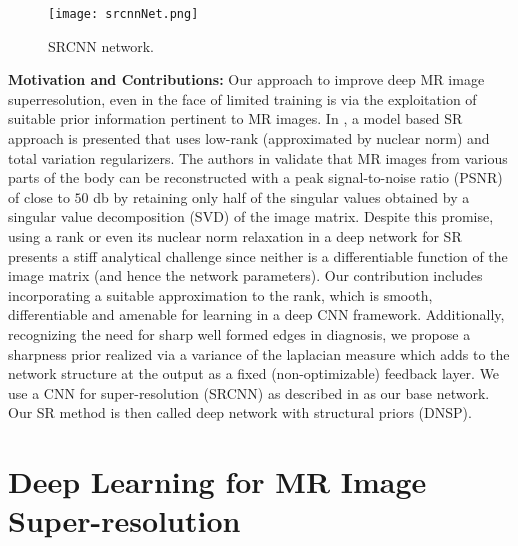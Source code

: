 \documentclass{article}
\def\sqz{\vspace{-3pt}}
\begin{document}
\begin{figure}
	\begin{center}
		\texttt{[image: srcnnNet.png]}
	\end{center}
	\vspace{-.5cm}\sqz
	\caption{\small{SRCNN network.}}\sqz\sqz\sqz\sqz\sqz\sqz\sqz\sqz\sqz
	\label{fig:SRCNN}
\end{figure}
\textbf{Motivation and Contributions:} Our approach to improve deep MR image superresolution, even in the face of limited training is via the exploitation of suitable prior information pertinent to MR images. In \cite{shi2015lrtv}, a model based SR approach is presented that uses low-rank (approximated by nuclear norm) and total variation regularizers. The authors in \cite{shi2015lrtv} validate that MR images from various parts of the body can be reconstructed with a peak signal-to-noise ratio (PSNR) of close to $50$ db by retaining only half of the singular values obtained by a singular value decomposition (SVD) of the image matrix. Despite this promise, using a rank or even its nuclear norm relaxation in a deep network for SR presents a stiff analytical challenge since neither is a differentiable function of the image matrix (and hence the network parameters). Our contribution includes incorporating a suitable approximation to the rank, which is smooth, differentiable and amenable for learning in a deep CNN framework. Additionally, recognizing the need for sharp well formed edges in diagnosis, we propose a sharpness prior realized via a variance of the laplacian measure which adds to the network structure at the output as a fixed (non-optimizable) feedback layer.  We use a CNN for super-resolution (SRCNN) as described in \cite{dong2016image} as our base network. Our SR method is then called deep network with structural priors (DNSP).

\sqz\sqz
\section{Deep Learning for MR Image Super-resolution}
\label{sec:DNSP}
\vspace{-.3cm}
\end{document}
